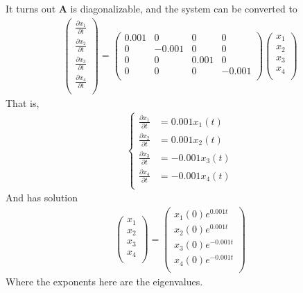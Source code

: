 \documentclass{article}
\theoremstyle{definition}
\begin{document}
It turns out $\mathbf{A}$ is diagonalizable, and the system can be converted to
\begin{align*}
\begin{pmatrix}
\frac{\partial x_1}{\partial t} \\
\frac{\partial x_2}{\partial t} \\
\frac{\partial x_3}{\partial t} \\
\frac{\partial x_4}{\partial t} \\
\end{pmatrix}=
\begin{pmatrix}
0.001&0 & 0& 0 \\
0& -0.001 & 0&0\\
0&0 & 0.001& 0\\
0& 0 & 0& -0.001 \\
\end{pmatrix}
\begin{pmatrix}
x_1 \\
x_2 \\
x_3 \\
x_4 \\
\end{pmatrix}
\end{align*}
That is,
\begin{align*}
\begin{cases}
	\frac{\partial x_1}{\partial t}&=0.001x_1(t)\\
	\frac{\partial x_2}{\partial t}&=0.001x_2(t)\\
	\frac{\partial x_3}{\partial t}&=-0.001x_3(t)\\
 	\frac{\partial x_4}{\partial t}&=-0.001x_4(t)\\
\end{cases}
\end{align*}
And has solution
\begin{align*}
    \begin{pmatrix}
x_1 \\
x_2 \\
x_3 \\
x_4 \\
\end{pmatrix}=
\begin{pmatrix}
x_1(0)e^{0.001t} \\
x_2(0)e^{0.001t} \\
x_3(0)e^{-0.001t} \\
x_4(0)e^{-0.001t} \\
\end{pmatrix}
\end{align*}
Where the exponents here are the eigenvalues.\par
\end{document}
